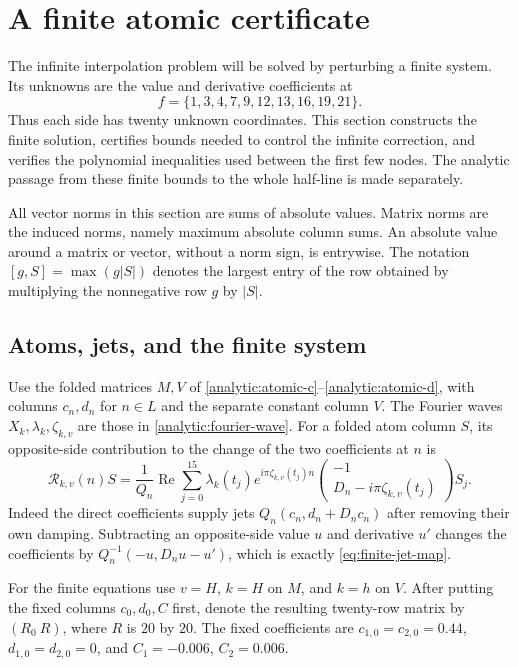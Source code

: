 \documentclass[11pt]{article}
\theoremstyle{remark}\newtheorem{remark}[theorem]{Remark}
\begin{document}
\section{A finite atomic certificate}
\label{sec:finite-certificate}

The infinite interpolation problem will be solved by perturbing a finite
system. Its unknowns are the value and derivative coefficients at
\[
 f=\{1,3,4,7,9,12,13,16,19,21\}.
\]
Thus each side has twenty unknown coordinates. This section constructs
the finite solution, certifies bounds needed to control the infinite
correction, and verifies the polynomial inequalities used between the
first few nodes. The analytic passage from these finite bounds to the
whole half-line is made separately.

All vector norms in this section are sums of absolute values. Matrix
norms are the induced norms, namely maximum absolute column sums.
An absolute value around a matrix or vector, without a norm sign, is
entrywise. The notation $[g,S]=\max(g|S|)$ denotes the largest entry of
the row obtained by multiplying the nonnegative row $g$ by $|S|$.

\subsection{Atoms, jets, and the finite system}

Use the folded matrices $M,V$ of
\eqref{analytic:atomic-c}--\eqref{analytic:atomic-d}, with columns
$c_n,d_n$ for $n\in L$ and the separate constant column $V$.
The Fourier waves $X_k,\lambda_k,\zeta_{k,v}$ are those in
\eqref{analytic:fourier-wave}.
For a folded atom column $S$, its opposite-side contribution to the
change of the two coefficients at $n$ is
\begin{equation}
 \mathcal R_{k,v}(n)S
 =\frac1{Q_n}\operatorname{Re}
 \sum_{j=0}^{15}
 \lambda_k(t_j)e^{i\pi\zeta_{k,v}(t_j)n}
 \begin{pmatrix}-1\\D_n-i\pi\zeta_{k,v}(t_j)\end{pmatrix}S_j.
 \label{eq:finite-jet-map}
\end{equation}
Indeed the direct coefficients supply jets
$Q_n(c_n,d_n+D_nc_n)$ after removing their own damping.
Subtracting an opposite-side value $u$ and derivative $u'$ changes the
coefficients by $Q_n^{-1}(-u,D_nu-u')$, which is exactly
\eqref{eq:finite-jet-map}.

For the finite equations use $v=H$, $k=H$ on $M$, and $k=h$ on $V$.
After putting the fixed columns $c_0,d_0,C$ first, denote the resulting
twenty-row matrix by $(R_0\ R)$, where $R$ is $20$ by $20$.
The fixed coefficients are $c_{1,0}=c_{2,0}=0.44$,
$d_{1,0}=d_{2,0}=0$, and $C_1=-0.006$, $C_2=0.006$.
\end{document}
